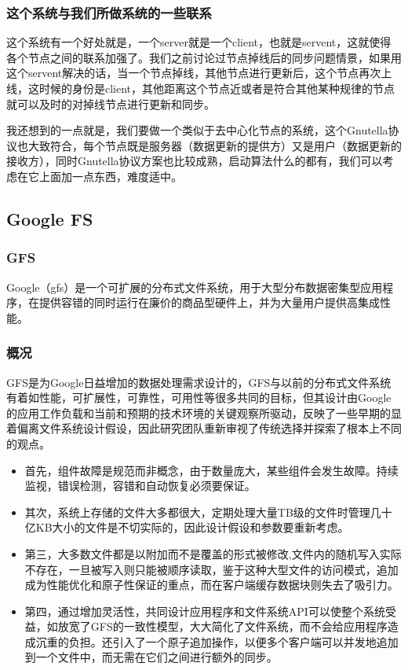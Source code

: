 \documentclass{ctexart}
\begin{document}
\subsubsection{这个系统与我们所做系统的一些联系}
这个系统有一个好处就是，一个server就是一个client，也就是servent，这就使得各个节点之间的联系加强了。我们之前讨论过节点掉线后的同步问题情景，如果用这个servent解决的话，当一个节点掉线，其他节点进行更新后，这个节点再次上线，这时候的身份是client，其他距离这个节点近或者是符合其他某种规律的节点就可以及时的对掉线节点进行更新和同步。

我还想到的一点就是，我们要做一个类似于去中心化节点的系统，这个Gnutella协议也大致符合，每个节点既是服务器（数据更新的提供方）又是用户（数据更新的接收方），同时Gnutella协议方案也比较成熟，启动算法什么的都有，我们可以考虑在它上面加一点东西，难度适中。
\subsection{Google FS}
\subsubsection{GFS}
Google（gfs）是一个可扩展的分布式文件系统，用于大型分布数据密集型应用程序，在提供容错的同时运行在廉价的商品型硬件上，并为大量用户提供高集成性能。\cite{GFS}
\subsubsection{概况}
GFS是为Google日益增加的数据处理需求设计的，GFS与以前的分布式文件系统有着如性能，可扩展性，可靠性，可用性等很多共同的目标，但其设计由Google的应用工作负载和当前和预期的技术环境的关键观察所驱动，反映了一些早期的显着偏离文件系统设计假设，因此研究团队重新审视了传统选择并探索了根本上不同的观点。
\begin{itemize}
	\item 首先，组件故障是规范而非概念，由于数量庞大，某些组件会发生故障。持续监视，错误检测，容错和自动恢复必须要保证。
	\item 其次，系统上存储的文件大多都很大，定期处理大量TB级的文件时管理几十亿KB大小的文件是不切实际的，因此设计假设和参数要重新考虑。
	\item 第三，大多数文件都是以附加而不是覆盖的形式被修改,文件内的随机写入实际不存在，一旦被写入则只能被顺序读取，鉴于这种大型文件的访问模式，追加成为性能优化和原子性保证的重点，而在客户端缓存数据块则失去了吸引力。
	\item 第四，通过增加灵活性，共同设计应用程序和文件系统API可以使整个系统受益，如放宽了GFS的一致性模型，大大简化了文件系统，而不会给应用程序造成沉重的负担。还引入了一个原子追加操作，以便多个客户端可以并发地追加到一个文件中，而无需在它们之间进行额外的同步。
\end{itemize}
\end{document}
